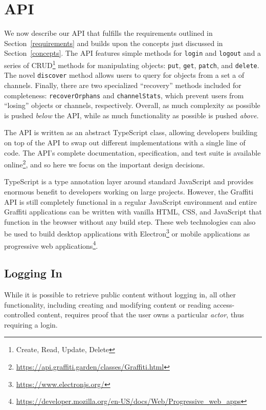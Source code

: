 \section{API}
\label{api}

We now describe our API that fulfills the requirements
outlined in Section~\ref{requirements} and builds upon the concepts
just discussed in Section~\ref{concepts}.
The API features simple methods for \texttt{login} and \texttt{logout}
and a series of CRUD\footnote{Create, Read, Update, Delete} methods for manipulating objects:
\texttt{put}, \texttt{get}, \texttt{patch}, and \texttt{delete}.
The novel \texttt{discover} method allows users to query for objects
from a set a of channels.
Finally, there are two specialized ``recovery'' methods included for completeness:
\texttt{recoverOrphans} and \texttt{channelStats},
which prevent users from ``losing'' objects or channels, respectively.
Overall, as much complexity as possible is pushed \emph{below} the API,
while as much functionality as possible is pushed \emph{above}.

The API is written as an abstract TypeScript class, allowing
developers building on top of the API to swap out different implementations
with a single line of code.
The API's complete documentation, specification, and test suite is available online\footnote{
    \url{https://api.graffiti.garden/classes/Graffiti.html}
}, and so here we focus on the important design decisions.

TypeScript is a type annotation layer around standard JavaScript
and provides enormous benefit to developers working on large projects.
However, the Graffiti API is still completely functional
in a regular JavaScript environment and entire Graffiti applications can be written
with vanilla HTML, CSS, and JavaScript that function in the browser without
any build step.
These web technologies can also be used to build desktop applications
with Electron\footnote{
    \url{https://www.electronjs.org/}
} or mobile applications as progressive web applications\footnote{
    \url{https://developer.mozilla.org/en-US/docs/Web/Progressive_web_apps}
}.

\subsection{Logging In}

While it is possible to retrieve public content without logging in,
all other functionality, including
creating and modifying content or reading access-controlled content,
requires proof that the user owns a particular \emph{actor}, thus requiring a login.

